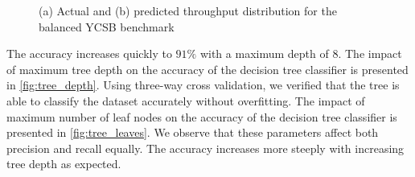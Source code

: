 \begin{figure}
\centering
{}

\caption{(a) Actual and (b) predicted throughput distribution for the
  balanced YCSB benchmark}
\label{fig:throughput_ycsb_balanced}
\end{figure}


The accuracy increases quickly to $91\%$ with a maximum depth of $8$. The impact
of maximum tree depth on the accuracy of the decision tree classifier
is presented in \cref{fig:tree_depth}. Using three-way cross validation,
we verified that the tree is able to classify the dataset accurately
without overfitting.
The impact of maximum number of leaf nodes on the accuracy of the
decision tree classifier is presented in \cref{fig:tree_leaves}.
We observe that these parameters affect both precision and recall
equally. The accuracy increases more steeply with increasing tree
depth as expected.

